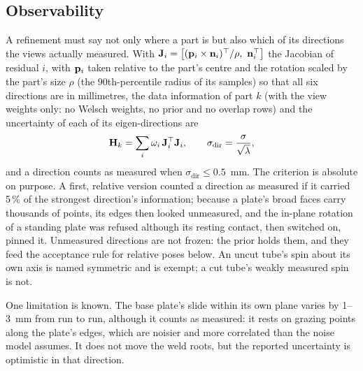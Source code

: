 \subsection{Observability}
\label{sec:mv_observe}
A refinement must say not only where a part is but also which of its directions the views actually
measured. With $\vect{J}_i=\big[(\vect{p}_i\times\vect{n}_i)^{\top}/\rho,\ \vect{n}_i^{\top}\big]$ the
Jacobian of residual $i$, with $\mathbf{p}_i$ taken relative to the part's centre and the rotation
scaled by the part's size $\rho$ (the 90th-percentile radius of its samples) so that all six
directions are in millimetres, the data information of part $k$ (with the view weights only: no
Welsch weights, no prior and no overlap rows) and the uncertainty of each of its eigen-directions
are
\begin{equation}
\mathbf{H}_k=\sum_i\omega_i\,\mathbf{J}_i^{\top}\mathbf{J}_i,\qquad
\sigma_{\mathrm{dir}} = \frac{\sigma}{\sqrt{\lambda}},
\label{eq:observability}
\end{equation}
and a direction counts as measured when $\sigma_{\mathrm{dir}}\le0.5$~mm. The criterion is absolute
on purpose. A first, relative version counted a direction as measured if it carried 5\,\% of the
strongest direction's information; because a plate's broad faces carry thousands of points, its
edges then looked unmeasured, and the in-plane rotation of a standing plate was refused although its
resting contact, then switched on, pinned it. Unmeasured directions are not frozen: the prior holds them, and they feed
the acceptance rule for relative poses below. An uncut tube's spin about its own axis is named symmetric and
is exempt; a cut tube's weakly measured spin is not.

One limitation is known. The base plate's slide within its own plane varies by 1--3~mm from run to
run, although it counts as measured: it rests on grazing points along the plate's edges, which are
noisier and more correlated than the noise model assumes. It does not move the weld roots, but the
reported uncertainty is optimistic in that direction.

